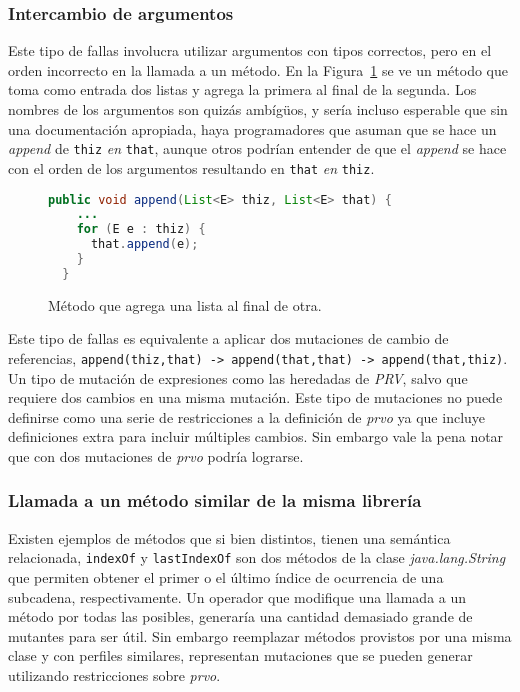 \subsubsection{Intercambio de argumentos}

Este tipo de fallas involucra utilizar argumentos con tipos correctos, pero en el orden incorrecto en la llamada a un m\'etodo. En la Figura~\ref{figures.examples.argumentSwap.example1} se ve un m\'etodo que toma como entrada dos listas y agrega la primera al final de la segunda. Los nombres de los argumentos son quiz\'as amb\'ig\"{u}os, y ser\'ia incluso esperable que sin una documentaci\'on apropiada, haya programadores que asuman que se hace un \emph{append} de \texttt{thiz} \emph{en} \texttt{that}, aunque otros podr\'ian entender de que el \emph{append} se hace con el orden de los argumentos resultando en \texttt{that} \emph{en} \texttt{thiz}. 

\begin{figure}
	\begin{lstlisting}[frame=single, mathescape=true,xleftmargin=0.012\textwidth,xrightmargin=0.012\textwidth,language=Java,basicstyle={}]
  public void append(List<E> thiz, List<E> that) {
    ...
    for (E e : thiz) {
      that.append(e);
    }
  }
	\end{lstlisting}
	\caption{M\'etodo que agrega una lista al final de otra.}
	\label{figures.examples.argumentSwap.example1}
\end{figure}

Este tipo de fallas es equivalente a aplicar dos mutaciones de cambio de referencias, \lstinline|append(thiz,that) -> append(that,that) -> append(that,thiz)|. Un tipo de mutaci\'on de expresiones como las heredadas de \emph{PRV}, salvo que requiere dos cambios en una misma mutaci\'on. Este tipo de mutaciones no puede definirse como una serie de restricciones a la definici\'on de \emph{prvo} ya que incluye definiciones extra para incluir m\'ultiples cambios. Sin embargo vale la pena notar que con dos mutaciones de \emph{prvo} podr\'ia lograrse.

\subsubsection{Llamada a un m\'etodo similar de la misma librer\'ia}

Existen ejemplos de m\'etodos que si bien distintos, tienen una sem\'antica relacionada, \texttt{indexOf} y \texttt{lastIndexOf} son dos m\'etodos de la clase \emph{java.lang.String} que permiten obtener el primer o el \'ultimo \'indice de ocurrencia de una subcadena, respectivamente. Un operador que modifique una llamada a un m\'etodo por todas las posibles, generar\'ia una cantidad demasiado grande de mutantes para ser \'util. Sin embargo reemplazar m\'etodos provistos por una misma clase y con perfiles similares, representan mutaciones que se pueden generar utilizando restricciones sobre \emph{prvo}.

